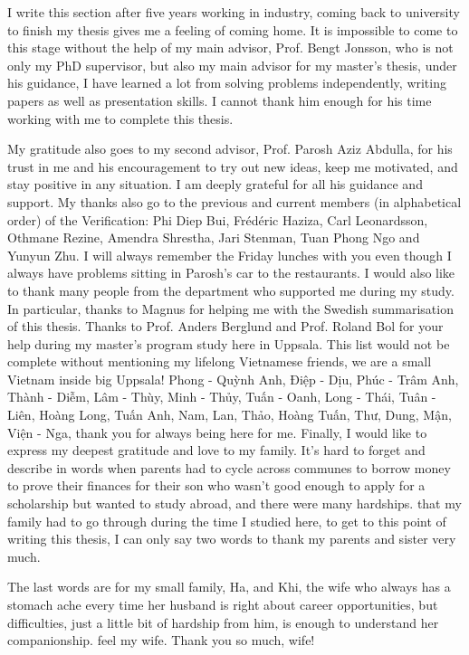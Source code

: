 
I write this section after five years working in industry, coming back to university to finish my thesis gives me a feeling of coming home. It is impossible to come to this stage without the help of my main advisor, Prof. Bengt Jonsson, who is not only my PhD supervisor, but also my main advisor for my master's thesis, under his guidance, I have learned a lot from solving problems independently, writing papers as well as presentation skills.  I cannot thank him enough for his time working with me to complete this thesis.

My gratitude also goes to my second advisor, Prof. Parosh Aziz Abdulla, for his trust in me and his encouragement to try out new ideas, keep me motivated, and stay positive in any situation. I am deeply grateful for all his guidance and support.
My thanks also go to the previous and current members (in alphabetical order) of the Verification: Phi Diep Bui, Frédéric Haziza, Carl Leonardsson, Othmane Rezine, Amendra Shrestha, Jari Stenman, Tuan Phong Ngo and Yunyun Zhu. I will always remember the Friday lunches with you even though I always have problems sitting in Parosh's car to the restaurants.
I would also like to thank many people from the department who supported me during my study. In particular, thanks to
Magnus for helping me with the Swedish summarisation of this thesis. Thanks to Prof. Anders Berglund and Prof. Roland Bol for your help during my master's program study here in Uppsala.
This list would not be complete without mentioning my lifelong Vietnamese friends, we are a small Vietnam inside big Uppsala! Phong - Quỳnh Anh, Điệp - Dịu, Phúc - Trâm Anh, Thành - Diễm,
Lâm - Thùy, Minh - Thủy, Tuấn - Oanh, Long - Thái, Tuân - Liên, Hoàng
Long, Tuấn Anh, Nam, Lan, Thảo, Hoàng Tuấn, Thư, Dung, Mận, Viện - Nga, thank you for always being here for me.
Finally, I would like to express my deepest gratitude and love to my family. It's hard to forget and describe in words when parents had to cycle across communes to borrow money to prove their finances for their son who wasn't good enough to apply for a scholarship but wanted to study abroad, and there were many hardships. that my family had to go through during the time I studied here, to get to this point of writing this thesis, I can only say two words to thank my parents and sister very much.

The last words are for my small family, Ha, and Khi, the wife who always has a stomach ache every time her husband is right about career opportunities, but difficulties, just a little bit of hardship from him, is enough to understand her companionship. feel my wife. Thank you so much, wife!

